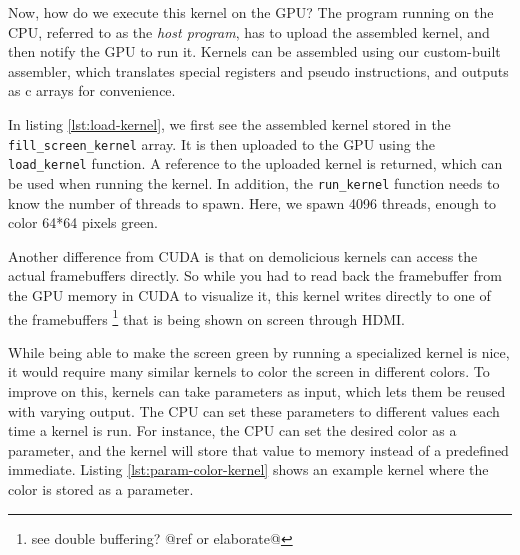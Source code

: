 \documentclass[../main/report.tex]{subfiles}
\begin{document}

Now, how do we execute this kernel on the GPU? 
The program running on the CPU, referred to as the \emph{host program},
has to upload the assembled kernel, and then notify the GPU to run it.
Kernels can be assembled using our custom-built assembler,
which translates special registers and pseudo instructions, and outputs as c arrays for convenience.



In listing \ref{lst:load-kernel}, we first see the assembled kernel stored in the
\verb/fill_screen_kernel/ array.
It is then uploaded to the GPU using the \verb/load_kernel/ function.
A reference to the uploaded kernel is returned, which can be used when running the kernel.
In addition, the \verb/run_kernel/ function needs to know the number of threads to spawn.
Here, we spawn 4096 threads, enough to color 64*64 pixels green.

Another difference from CUDA is that on demolicious kernels can access the actual framebuffers directly. 
So while you had to read back the framebuffer from the GPU memory in CUDA to visualize it, 
this kernel writes directly to one of the framebuffers \footnote{see double buffering? @ref or elaborate@} that is being shown on screen through HDMI.

While being able to make the screen green by running a specialized kernel is nice,
it would require many similar kernels to color the screen in different colors.
To improve on this, kernels can take parameters as input,
which lets them be reused with varying output.
The CPU can set these parameters to different values each time a kernel is run.
For instance, the CPU can set the desired color as a parameter,
and the kernel will store that value to memory instead of a predefined immediate.
Listing \ref{lst:param-color-kernel} shows an example kernel where the color is stored as a parameter.
\end{document}
